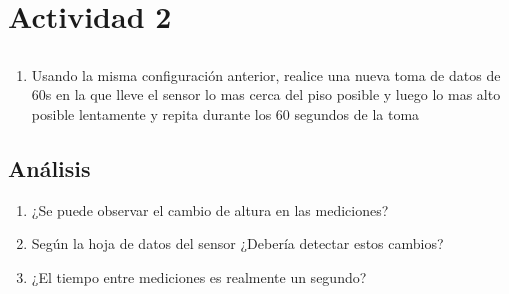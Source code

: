 \section{Actividad 2}
\subsection{\pro}
\begin{enumerate}
    \item Usando la misma configuración anterior, realice una nueva toma de datos de 60s en la que lleve el sensor lo mas cerca del piso posible y luego lo mas alto posible lentamente y repita durante los 60 segundos de la toma
\end{enumerate}
\subsection{Análisis}
\begin{enumerate}
    \item ¿Se puede observar el cambio de altura en las mediciones?
    \item Según la hoja de datos del sensor ¿Debería detectar estos cambios?
    \item ¿El tiempo entre mediciones es realmente un segundo?
\end{enumerate}

